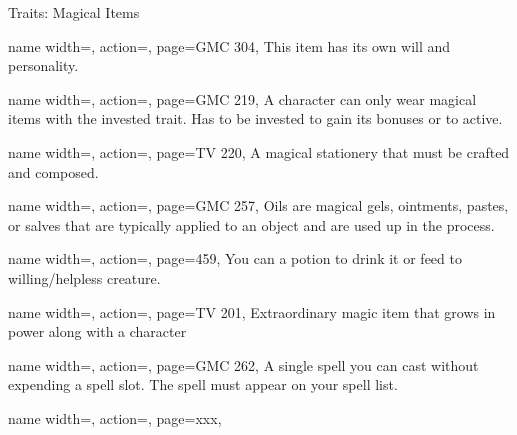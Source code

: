 \begin{PageBack}
\begin{Tables}{\backTableHeight}
\begin{Table}{Traits: Magical Items}
\begin{entry}{}{%
                name width=\conditionLength,%
                action=\Intelligent,
                page=GMC 304,
            }
                This item has its own will and personality.
            \end{entry}
            \begin{entry}{}{%
                name width=\conditionLength,%
                action=\Invested,
                page=GMC 219,
            }
                A character can only wear  magical items with the invested trait.
                Has to be invested to gain its bonuses or to active.
            \end{entry}
            \begin{entry}{}{%
                name width=\conditionLength,%
                action=\Missive,
                page=TV 220,
            }
                A magical stationery that must be crafted and composed.
            \end{entry}
            \begin{entry}{}{%
                name width=\conditionLength,%
                action=\Oil,
                page=GMC 257,
            }
                Oils are magical gels, ointments, pastes, or salves that are typically applied to an object and are used up in the process.
            \end{entry}
            \begin{entry}{}{%
                name width=\conditionLength,%
                action=\Potion,
                page=459,
            }
                You can  a potion to drink it or feed to willing/helpless creature.\hfill
            \end{entry}
            \begin{entry}{}{%
                name width=\conditionLength,%
                action=\Relic,
                page=TV 201,
            }
                Extraordinary magic item that grows in power along with a character
            \end{entry}
            \begin{entry}{}{%
                name width=\conditionLength,%
                action=\Scroll,
                page=GMC 262,
            }
                A single spell you can cast without expending a spell slot.
                The spell must appear on your spell list.\hfill
            \end{entry}
            \begin{entry}{}{%
                name width=\conditionLength,%
                action=\Spellgun,
                page=xxx,
            }

\end{entry}
\end{Table}
\end{Tables}
\end{PageBack}
